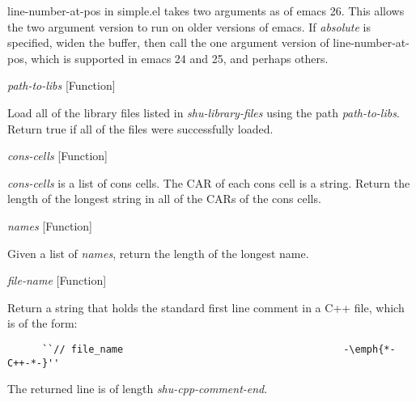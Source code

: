 \begin{doc-string}
line-number-at-pos in simple.el takes two arguments as of emacs 26.  This
allows the two argument version to run on older versions of emacs.  If
\emph{absolute} is specified, widen the buffer, then call the one argument version
of line-number-at-pos, which is supported in emacs 24 and 25, and perhaps
others.
\end{doc-string}

\vspace{1em}
\noindent
{}
\usebox{\funcname}\emph{path-to-libs}
 \hfill [Function]

\begin{doc-string}
Load all of the library files listed in \emph{shu-library-files} using the path
\emph{path-to-libs}.  Return true if all of the files were successfully loaded.
\end{doc-string}

\vspace{1em}
\noindent
{}
\usebox{\funcname}\emph{cons-cells}
 \hfill [Function]

\begin{doc-string}
\emph{cons-cells} is a list of cons cells.  The CAR of each cons cell is a string.
Return the length of the longest string in all of the CARs of the cons cells.
\end{doc-string}

\vspace{1em}
\noindent
{}
\usebox{\funcname}\emph{names}
 \hfill [Function]

\begin{doc-string}
Given a list of \emph{names}, return the length of the longest name.
\end{doc-string}

\vspace{1em}
\noindent
{}
\usebox{\funcname}\emph{file-name}
 \hfill [Function]

\begin{doc-string}
Return a string that holds the standard first line comment in a C++ file,
which is of the form:

\small{\begin{verbatim}
      ``// file_name                                      -\emph{*-C++-*-}''
\end{verbatim}}

The returned line is of length \emph{shu-cpp-comment-end}.
\end{doc-string}

